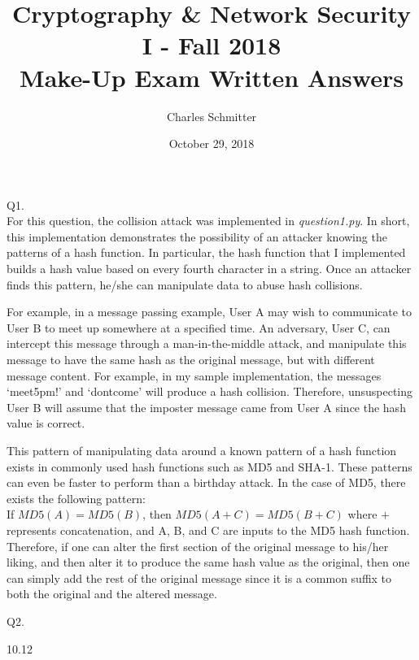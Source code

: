 \documentclass[11pt]{article}
\title{Cryptography \& Network Security I - Fall 2018\\ \large Make-Up Exam Written Answers}
\author{Charles Schmitter}
\date{October 29, 2018}
\newcommand{\gap}{\vspace{3mm}}
\newcommand{\bigGap}{\vspace{10mm}}
\begin{document}
\maketitle

Q1.\\

For this question, the collision attack was implemented in \textit{question1.py}. In short, this implementation demonstrates the possibility of an attacker knowing the patterns of a hash function. In particular, the hash function that I implemented builds a hash value based on every fourth character in a string. Once an attacker finds this pattern, he/she can manipulate data to abuse hash collisions.\\

\gap{}

For example, in a message passing example, User A may wish to communicate to User B to meet up somewhere at a specified time. An adversary, User C, can intercept this message through a man-in-the-middle attack, and manipulate this message to have the same hash as the original message, but with different message content. For example, in my sample implementation, the messages `meet5pm!' and `dontcome' will produce a hash collision. Therefore, unsuspecting User B will assume that the imposter message came from User A since the hash value is correct.\\

\gap{}

This pattern of manipulating data around a known pattern of a hash function exists in commonly used hash functions such as MD5 and SHA-1. These patterns can even be faster to perform than a birthday attack. In the case of MD5, there exists the following pattern:\\
If $MD5(A)=MD5(B)$, then $MD5(A+C)=MD5(B+C)$ where $+$ represents concatenation, and A, B, and C are inputs to the MD5 hash function. Therefore, if one can alter the first section of the original message to his/her liking, and then alter it to produce the same hash value as the original, then one can simply add the rest of the original message since it is a common suffix to both the original and the altered message.

\bigGap{}

Q2. \\

\gap{}

10.12\\
\end{document}
